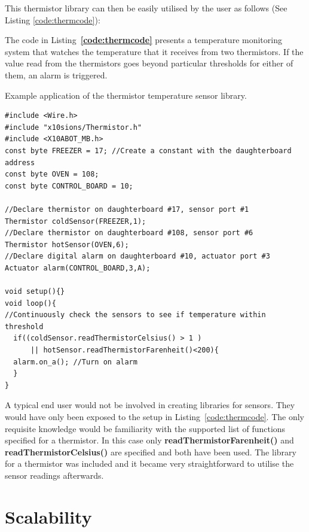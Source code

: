 This thermistor library can then be easily utilised by the user as follows (See Listing \ref{code:thermcode}):

The code in Listing~\textbf{\ref{code:thermcode}} presents a temperature monitoring system that watches the temperature that it receives from two thermistors. If the value read from the thermistors goes beyond particular thresholds for either of them, an alarm is triggered.
\begin{listing}
		\footnotesize
        {\fontsize{8}{6}\selectfont
		\caption{Example application of the thermistor temperature sensor library.} \label{code:thermcode}
		\begin{verbatim}
#include <Wire.h>  
#include "x10sions/Thermistor.h"
#include <X10ABOT_MB.h>
const byte FREEZER = 17; //Create a constant with the daughterboard address
const byte OVEN = 108;
const byte CONTROL_BOARD = 10;

//Declare thermistor on daughterboard #17, sensor port #1
Thermistor coldSensor(FREEZER,1);
//Declare thermistor on daughterboard #108, sensor port #6
Thermistor hotSensor(OVEN,6);
//Declare digital alarm on daughterboard #10, actuator port #3
Actuator alarm(CONTROL_BOARD,3,A);

void setup(){}
void loop(){
//Continuously check the sensors to see if temperature within threshold
  if((coldSensor.readThermistorCelsius() > 1 )
      || hotSensor.readThermistorFarenheit()<200){
  alarm.on_a(); //Turn on alarm 
  }
}
	\end{verbatim}
		}
\end{listing}

A typical end user would not be involved in creating libraries for sensors. They would have only been exposed to the setup in Listing~\ref{code:thermcode}. The only requisite knowledge would be familiarity with the supported list of functions specified for a thermistor. In this case only \textbf{readThermistorFarenheit()} and  \textbf{readThermistorCelsius()} are specified and both have been used.
The library for a thermistor was included and it became very straightforward to utilise the sensor readings afterwards.
\newpage
\section{Scalability} %
\label{sec:scalability}

